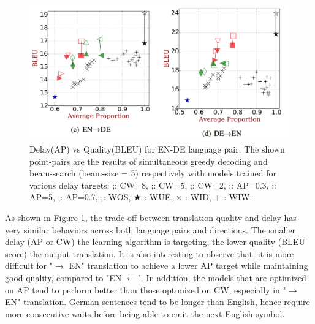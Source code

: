 \documentclass{sfuthesis}
\DeclareRobustCommand\marksymbol[2]{\tikz[#2,scale=1.2]\pgfuseplotmark{#1};}
\begin{document}
\begin{figure}[h]
\centering
\includegraphics[scale=0.17]{./images/EN-DE}
\vspace{0.7cm}
\caption[Quality(BLEU) vs Delay(AP) for policy gradient agent.]
{Delay(AP) vs Quality(BLEU) for EN-DE language pair. The shown point-pairs are the results of simultaneous greedy decoding and beam-search (beam-size = 5) respectively with models trained for various delay targets:
\marksymbol{$\blacktriangleleft \quad \vartriangleleft $}{black!40!green}\qquad : CW=8,
\marksymbol{$\blacktriangle \quad \triangle $}{black!40!green}\qquad : CW=5,
\marksymbol{$\blacklozenge \quad \lozenge $}{black!40!green}\qquad : CW=2,
\marksymbol{$\blacktriangleright \quad \vartriangleright $}{red}\qquad : AP=0.3,
\marksymbol{$\blacktriangledown \quad \triangledown $}{red}\qquad : AP=5,
\marksymbol{$\blacksquare \quad \square $}{red}\qquad : AP=0.7,
\marksymbol{$\bigstar$}{blue}\quad : WOS,
$\bigstar$  : WUE,
$\times$ : WID, $+$ : WIW. 
}
\label{fig:PG0}
\end{figure}

As shown in Figure \ref{fig:PG0}, the trade-off between translation quality and delay has very similar behaviors across both language pairs and directions. The smaller delay (AP or CW) the learning algorithm is targeting, the lower quality (BLEU score) the output translation. It is also interesting to observe that, it is more difficult for "$\rightarrow$ EN" translation to achieve a lower AP target while maintaining good quality, compared to "EN $\leftarrow$". In addition, the models that are optimized on AP tend to perform better than those optimized on CW, especially in "$\rightarrow$ EN" translation. German sentences tend to be longer than English, hence require more consecutive waits before being able to emit the next English symbol.
\end{document}
